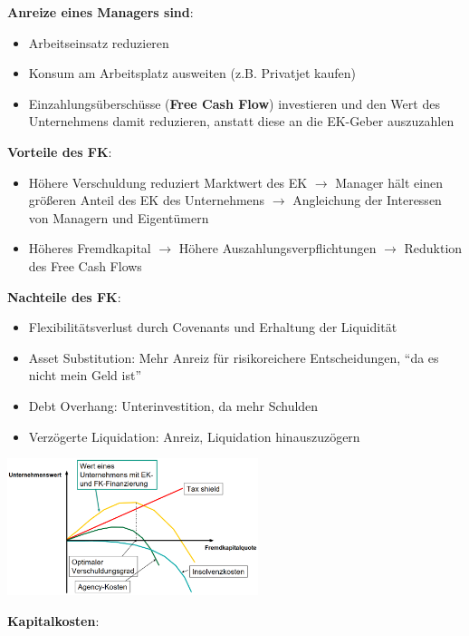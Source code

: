 \textbf{Anreize eines Managers sind}:
\begin{itemize}
	\item Arbeitseinsatz reduzieren
	\item Konsum am Arbeitsplatz ausweiten (z.B. Privatjet kaufen)
	\item Einzahlungsüberschüsse (\textbf{Free Cash Flow}) investieren und den Wert des Unternehmens damit reduzieren, anstatt diese an die EK-Geber auszuzahlen
\end{itemize}

\textbf{Vorteile des FK}:
\begin{itemize}
	\item Höhere Verschuldung reduziert Marktwert des EK $\rightarrow$ Manager hält einen größeren Anteil des EK des Unternehmens $\rightarrow$ Angleichung der Interessen von Managern und Eigentümern
	\item Höheres Fremdkapital $\rightarrow$ Höhere Auszahlungsverpflichtungen $\rightarrow$ Reduktion des Free Cash Flows
\end{itemize}

\textbf{Nachteile des FK}:
\begin{itemize}
	\item Flexibilitätsverlust durch Covenants und Erhaltung der Liquidität
	\item Asset Substitution: Mehr Anreiz für risikoreichere Entscheidungen, \enquote{da es nicht mein Geld ist}
	\item Debt Overhang: Unterinvestition, da mehr Schulden
	\item Verzögerte Liquidation: Anreiz, Liquidation hinauszuzögern
\end{itemize}

\begin{center}
	\includegraphics[width=0.55\textwidth]{images/tot.png}
\end{center}

\textbf{Kapitalkosten}:

